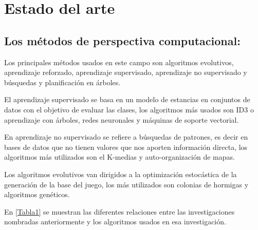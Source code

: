 \chapter[Estado del arte]{\label{identificadorReferenciaCruzada}
Estado del arte}

\section{Los métodos de perspectiva computacional:}

Los principales métodos usados en este campo son algoritmos evolutivos, aprendizaje reforzado, aprendizaje supervisado, aprendizaje no supervisado y búsquedas y planificación en árboles.

El aprendizaje supervisado se basa en un modelo de estancias en conjuntos de datos con el objetivo de evaluar las clases, los algoritmos más usados son ID3 o aprendizaje con árboles, redes neuronales y máquinas de soporte vectorial.
	
En aprendizaje no supervisado se refiere a búsquedas de patrones, es decir en bases de datos que no tienen valores que nos aporten información directa, los algoritmos más utilizados son el K-medias y auto-organización de mapas.

Los algoritmos evolutivos van dirigidos a la optimización estocástica de la generación de la base del juego, los más utilizados son colonias de hormigas y algoritmos genéticos.

En \ref{Tabla1} se muestran las diferentes relaciones entre las investigaciones nombradas anteriormente y los algoritmos usados en esa investigación\cite{B1}.


